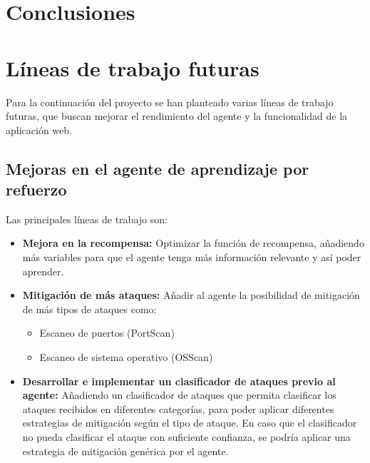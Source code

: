 
\section{Conclusiones}

\section{Líneas de trabajo futuras}
Para la continuación del proyecto se han planteado varias líneas de trabajo futuras, que buscan mejorar el rendimiento del agente y la funcionalidad de la aplicación web. 

\subsection{Mejoras en el agente de aprendizaje por refuerzo}
Las principales líneas de trabajo son:
\begin{itemize}
    \item \textbf{Mejora en la recompensa:} Optimizar la función de recompensa, añadiendo más variables para que el agente tenga más información relevante y así poder aprender.
    \item \textbf{Mitigación de más ataques:} Añadir al agente la posibilidad de mitigación de más tipos de ataques como:
    \begin{itemize}
        \item Escaneo de puertos (PortScan)
        \item Escaneo de sistema operativo (OSScan)
    \end{itemize}
    \item \textbf{Desarrollar e implementar un clasificador de ataques previo al agente:} Añadiendo un clasificador de ataques que permita clasificar los ataques recibidos en diferentes categorías, para poder aplicar diferentes estrategias de mitigación según el tipo de ataque. En caso que el clasificador no pueda clasificar el ataque con suficiente confianza, se podría aplicar una estrategia de mitigación genérica por el agente.
\end{itemize}

